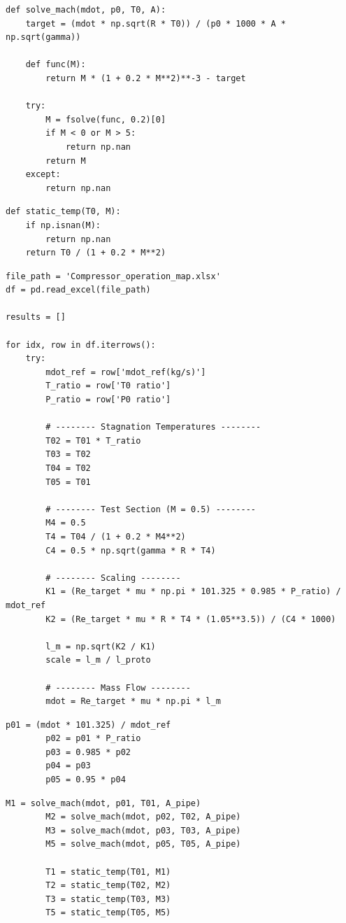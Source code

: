\documentclass[12pt]{article}
\begin{document}
\begin{lstlisting}[caption={Mach Number Solver}]
def solve_mach(mdot, p0, T0, A):
    target = (mdot * np.sqrt(R * T0)) / (p0 * 1000 * A * np.sqrt(gamma))

    def func(M):
        return M * (1 + 0.2 * M**2)**-3 - target

    try:
        M = fsolve(func, 0.2)[0]
        if M < 0 or M > 5:
            return np.nan
        return M
    except:
        return np.nan
\end{lstlisting}
\begin{lstlisting}[caption={Temperature Calculations}]
def static_temp(T0, M):
    if np.isnan(M):
        return np.nan
    return T0 / (1 + 0.2 * M**2)
\end{lstlisting}
\newpage
\begin{lstlisting}[caption={Main Scaling and Flow Computation}]
file_path = 'Compressor_operation_map.xlsx'
df = pd.read_excel(file_path)

results = []

for idx, row in df.iterrows():
    try:
        mdot_ref = row['mdot_ref(kg/s)']
        T_ratio = row['T0 ratio']
        P_ratio = row['P0 ratio']

        # -------- Stagnation Temperatures --------
        T02 = T01 * T_ratio
        T03 = T02
        T04 = T02
        T05 = T01

        # -------- Test Section (M = 0.5) --------
        M4 = 0.5
        T4 = T04 / (1 + 0.2 * M4**2)
        C4 = 0.5 * np.sqrt(gamma * R * T4)

        # -------- Scaling --------
        K1 = (Re_target * mu * np.pi * 101.325 * 0.985 * P_ratio) / mdot_ref
        K2 = (Re_target * mu * R * T4 * (1.05**3.5)) / (C4 * 1000)

        l_m = np.sqrt(K2 / K1)
        scale = l_m / l_proto

        # -------- Mass Flow --------
        mdot = Re_target * mu * np.pi * l_m
\end{lstlisting}
\begin{lstlisting}[caption={Pressure Calculations}]
        p01 = (mdot * 101.325) / mdot_ref
        p02 = p01 * P_ratio
        p03 = 0.985 * p02
        p04 = p03
        p05 = 0.95 * p04
\end{lstlisting}
\begin{lstlisting}[caption={Mach Numbers and Static Properties}]
        M1 = solve_mach(mdot, p01, T01, A_pipe)
        M2 = solve_mach(mdot, p02, T02, A_pipe)
        M3 = solve_mach(mdot, p03, T03, A_pipe)
        M5 = solve_mach(mdot, p05, T05, A_pipe)

        T1 = static_temp(T01, M1)
        T2 = static_temp(T02, M2)
        T3 = static_temp(T03, M3)
        T5 = static_temp(T05, M5)
\end{lstlisting}
\end{document}
